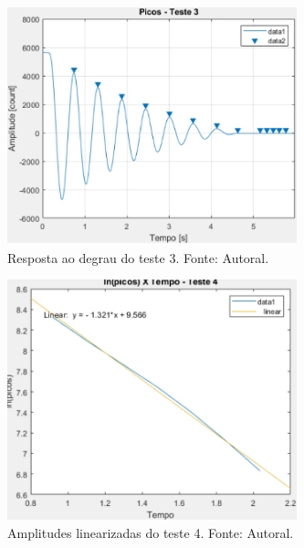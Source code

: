 \documentclass{ifacconf}
\begin{document}
\begin{figure}[!htb]
  \begin{center}
  \includegraphics[width=8.4cm]{figures/picos_teste_3.png}    %
  \caption{Resposta ao degrau do teste 3. Fonte: Autoral.} 
  \label{fig:picos_teste_3}
  \end{center}
\end{figure}

\begin{figure}[!htb]
  \begin{center}
  \includegraphics[width=8.4cm]{figures/regressao_teste_4.png}    %
  \caption{Amplitudes linearizadas do teste 4. Fonte: Autoral.} 
  \label{fig:regressao_teste_4}
  \end{center}
\end{figure}
\end{document}
